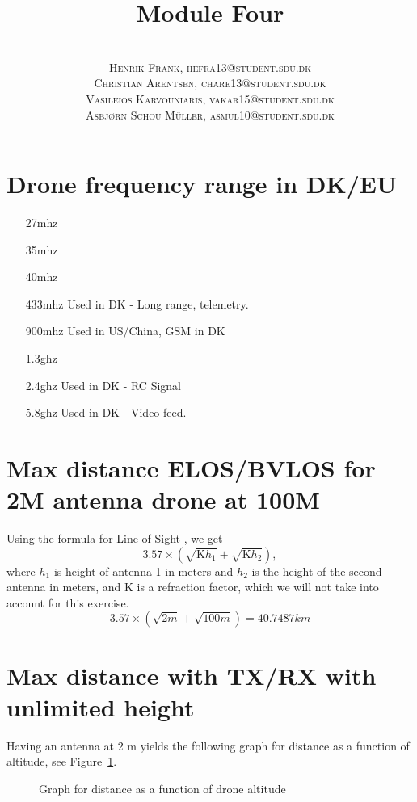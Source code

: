 \documentclass[paper=letter, fontsize=10pt]{article}
\title{\vspace{-15mm}\fontsize{24pt}{10pt}\selectfont\textbf{Module Four}} %
\author{
\large
{\textsc{}}\\[2mm]
{\textsc{Henrik Frank, hefra13@student.sdu.dk }}\\[2mm]
{\textsc{Christian Arentsen, chare13@student.sdu.dk }}\\[2mm]
{\textsc{Vasileios Karvouniaris, vakar15@student.sdu.dk }}\\[2mm]
{\textsc{Asbjørn Schou Müller, asmul10@student.sdu.dk }}
}
\date{}
\begin{document}
\maketitle %
\thispagestyle{fancy} %



\section{Drone frequency range in DK/EU}
\begin{enumerate}
\item[27mhz]
\item[35mhz]
\item[40mhz]
\item[433mhz] Used in DK - Long range, telemetry.
\item[900mhz] Used in US/China, GSM in DK
\item[1.3ghz]
\item[2.4ghz] Used in DK - RC Signal
\item[5.8ghz] Used in DK - Video feed.
\end{enumerate}

\section{Max distance ELOS/BVLOS for 2M antenna drone at 100M}
Using the formula for Line-of-Sight \cite{los_estimation}, we get 
\begin{equation}
3.57\times(\sqrt{\text{K}h_{1}} + \sqrt{\text{K}h_{2}}),
\end{equation}
where $h_{1}$ is height of antenna 1 in meters and $h_{2}$ is the height of the second antenna in meters, and K is a refraction factor, which we will not take into account for this exercise.
\begin{equation}
3.57\times(\sqrt{2m} + \sqrt{100m}) = 40.7487 km
\end{equation}

\section{Max distance with TX/RX with unlimited height}
Having an antenna at 2 m yields the following graph for distance as a function of altitude, see Figure~\ref{fig_maxdist}.
\begin{figure}
\centering
{}
\caption{Graph for distance as a function of drone altitude}
\label{fig_maxdist}
\end{figure}
\end{document}
